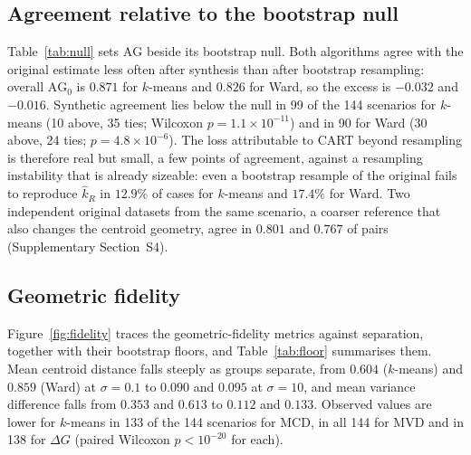 \documentclass[pdflatex,referee]{sn-jnl}
\begin{document}
\subsection{Agreement relative to the bootstrap null}
\label{sec:excess}

Table~\ref{tab:null} sets $\mathrm{AG}$ beside its bootstrap null. Both
algorithms agree with the original estimate less often after synthesis than
after bootstrap resampling: overall $\mathrm{AG}_0$ is $0.871$ for $k$-means
and $0.826$ for Ward, so the excess is $-0.032$ and $-0.016$. Synthetic
agreement lies below the null in 99 of the 144 scenarios for $k$-means
(10 above, 35 ties; Wilcoxon $p = 1.1 \times 10^{-11}$) and in 90 for Ward
(30 above, 24 ties; $p = 4.8 \times 10^{-6}$). The loss attributable to CART
beyond resampling is therefore real but small, a few points of agreement,
against a resampling instability that is already sizeable: even a bootstrap
resample of the original fails to reproduce $\hat{k}_R$ in $12.9\%$ of cases
for $k$-means and $17.4\%$ for Ward. Two independent original datasets
from the same scenario, a coarser reference that also changes the centroid
geometry, agree in $0.801$ and $0.767$ of pairs (Supplementary Section~S4).

\begin{table}[!tbp]
\centering
\caption{Agreement with the original estimate after CART synthesis
         ($\mathrm{AG}$) and after bootstrap resampling of the original data
         ($\mathrm{AG}_0$, $B = 30$ resamples per original dataset), and the
         excess $\mathrm{AG} - \mathrm{AG}_0$; negative values mean that
         synthesis loses agreement beyond resampling. Candidate range
         $\{2,\dots,8\}$. The excess is computed before rounding.}
\label{tab:null}
\small

\end{table}

\subsection{Geometric fidelity}
\label{sec:geometry}

Figure~\ref{fig:fidelity} traces the geometric-fidelity metrics against
separation, together with their bootstrap floors, and
Table~\ref{tab:floor} summarises them. Mean centroid distance falls steeply as
groups separate, from $0.604$ ($k$-means) and $0.859$ (Ward) at
$\sigma = 0.1$ to $0.090$ and $0.095$ at $\sigma = 10$, and mean variance
difference falls from $0.353$ and $0.613$ to $0.112$ and $0.133$. Observed
values are lower for $k$-means in 133 of the 144 scenarios for MCD, in all 144
for MVD and in 138 for $\Delta G$ (paired Wilcoxon $p < 10^{-20}$ for each).
\end{document}
